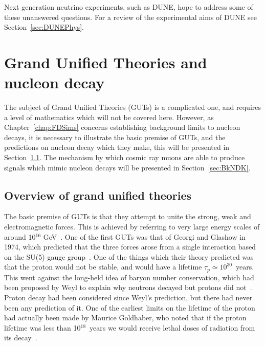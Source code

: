 Next generation neutrino experiments, such as DUNE, hope to address some of these unanswered questions. For a review of the experimental aims of DUNE see Section~\ref{sec:DUNEPhys}. \\

\section{Grand Unified Theories and nucleon decay}  \label{sec:Theory_GUT} %
The subject of Grand Unified Theories (GUTs) is a complicated one, and requires a level of mathematics which will not be covered here. However, as Chapter~\ref{chap:FDSims} concerns establishing background limits to nucleon decays, it is necessary to illustrate the basic premise of GUTs, and the predictions on nucleon decay which they make, this will be presented in Section~\ref{sec:Theory_NDK}. The mechanism by which cosmic ray muons are able to produce signals which mimic nucleon decays will be presented in Section~\ref{sec:BkNDK}.\\

\subsection{Overview of grand unified theories} \label{sec:Theory_NDK}  %
The basic premise of GUTs is that they attempt to unite the strong, weak and electromagnetic forces. This is achieved by referring to very large energy scales of around 10$^{16}$ GeV~\citep{PhysRevD.25.3092}. One of the first GUTs was that of Georgi and Glashow in 1974, which predicted that the three forces arose from a single interaction based on the SU(5) gauge group~\citep{PhysRevLett.32.438}. One of the things which their theory predicted was that the proton would not be stable, and would have a lifetime $\tau_{p} \simeq 10^{30}$~years. This went against the long-held idea of baryon number conservation, which had been proposed by Weyl to explain why neutrons decayed but protons did not~\citep{Weyl1929}. Proton decay had been considered since Weyl's prediction, but there had never been any prediction of it. One of the earliest limits on the lifetime of the proton had actually been made by Maurice Goldhaber, who noted that if the proton lifetime was less than 10$^{18}$~years we would receive lethal doses of radiation from its decay~\citep{Senjanovic:2009kr}. \\


